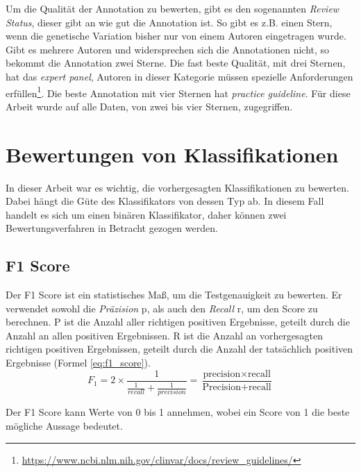 Um die Qualität der Annotation zu bewerten, gibt es den sogenannten \emph{Review Status}, dieser gibt an wie gut die Annotation ist. So gibt es z.B. einen Stern, wenn die genetische Variation bisher nur von einem Autoren eingetragen wurde. Gibt es mehrere Autoren und widersprechen sich die Annotationen nicht, so bekommt die Annotation zwei Sterne. Die fast beste Qualität, mit drei Sternen, hat das \emph{expert panel}, Autoren in dieser Kategorie müssen spezielle Anforderungen erfüllen\footnote{\url{https://www.ncbi.nlm.nih.gov/clinvar/docs/review_guidelines/}}. Die beste Annotation mit vier Sternen hat \emph{practice guideline}. Für diese Arbeit wurde auf alle Daten, von zwei bis vier Sternen, zugegriffen.



\section{Bewertungen von Klassifikationen}
In dieser Arbeit war es wichtig, die vorhergesagten Klassifikationen zu bewerten. Dabei hängt die Güte des Klassifikators von dessen Typ ab. In diesem Fall handelt es sich um einen binären Klassifikator, daher können zwei Bewertungsverfahren in Betracht gezogen werden.

\subsection{F1 Score}
Der F1 Score ist ein statistisches Maß, um die Testgenauigkeit zu bewerten. Er verwendet sowohl die \emph{Präzision} p, als auch den \emph{Recall} r, um den Score zu berechnen. P ist die Anzahl aller richtigen positiven Ergebnisse, geteilt durch die Anzahl an allen positiven Ergebnissen. R ist die Anzahl an vorhergesagten richtigen positiven Ergebnissen, geteilt durch die Anzahl der tatsächlich positiven Ergebnisse (Formel \ref{eq:f1_score}). 
\begin{equation}
    F_{1} = 2 \times \frac{1}{\frac{1}{recall}+\frac{1}{precision}} = \frac{\text{precision} \times \text{recall}}{\text{Precision} + \text{recall}}
    \label{eq:f1_score}
\end{equation}

Der F1 Score kann Werte von 0 bis 1 annehmen, wobei ein Score von 1 die beste mögliche Aussage bedeutet.


